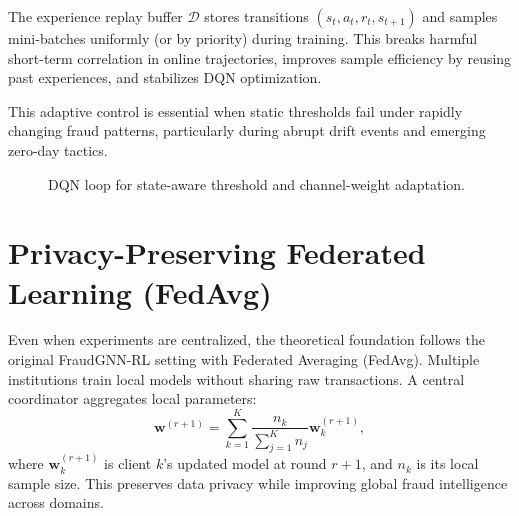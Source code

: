 \documentclass[12pt,a4paper]{report}
\begin{document}
The experience replay buffer $\mathcal{D}$ stores transitions $(s_t,a_t,r_t,s_{t+1})$ and samples mini-batches uniformly (or by priority) during training. This breaks harmful short-term correlation in online trajectories, improves sample efficiency by reusing past experiences, and stabilizes DQN optimization.

This adaptive control is essential when static thresholds fail under rapidly changing fraud patterns, particularly during abrupt drift events and emerging zero-day tactics.

\begin{figure}[htbp]
\centering
{}
\caption{DQN loop for state-aware threshold and channel-weight adaptation.}
\label{fig:dqn-adaptive-loop}
\end{figure}

\section{Privacy-Preserving Federated Learning (FedAvg)}
Even when experiments are centralized, the theoretical foundation follows the original FraudGNN-RL setting with Federated Averaging (FedAvg). Multiple institutions train local models without sharing raw transactions. A central coordinator aggregates local parameters:
\begin{equation}
\mathbf{w}^{(r+1)}=
\sum_{k=1}^{K}\frac{n_k}{\sum_{j=1}^{K}n_j}\mathbf{w}_k^{(r+1)},
\end{equation}
where $\mathbf{w}_k^{(r+1)}$ is client $k$'s updated model at round $r+1$, and $n_k$ is its local sample size. This preserves data privacy while improving global fraud intelligence across domains.
\end{document}
